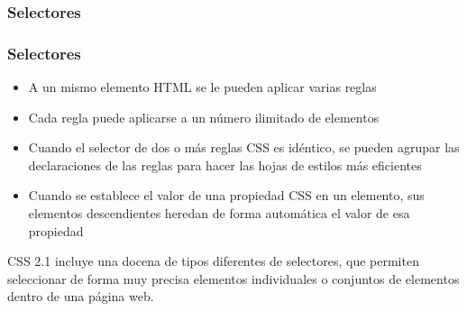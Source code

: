 %
%
%



\subsubsection*{Selectores}

\begin{frame}
\frametitle{Selectores}

\begin{itemize}
  \item A un mismo elemento HTML se le pueden aplicar varias reglas 
  \item Cada regla puede aplicarse a un número ilimitado de elementos
  \item Cuando el selector de dos o más reglas CSS es idéntico, se pueden agrupar las declaraciones de las reglas para hacer las hojas de estilos más eficientes
  \item Cuando se establece el valor de una propiedad CSS en un elemento, sus elementos descendientes heredan de forma automática el valor de esa propiedad
\end{itemize}

CSS 2.1 incluye una docena de tipos diferentes de selectores, que permiten seleccionar de forma muy precisa elementos individuales o conjuntos de elementos dentro de una página web.

\end{frame}

